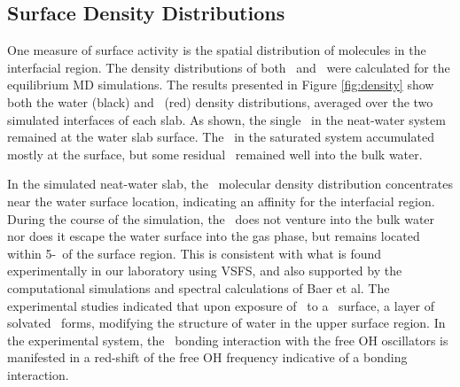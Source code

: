 \subsection{Surface Density Distributions}

One measure of surface activity is the spatial distribution of molecules in the interfacial region. The density distributions of both \wat~and \suldiox~were calculated for the equilibrium MD simulations. The results presented in Figure \ref{fig:density} show both the water (black) and \suldiox~(red) density distributions, averaged over the two simulated interfaces of each slab. As shown, the single \suldiox~in the neat-water system remained at the water slab surface. The \suldiox~in the saturated system accumulated mostly at the surface, but some residual \suldiox~remained well into the bulk water.



In the simulated neat-water slab, the \suldiox~molecular density distribution concentrates near the water surface location, indicating an affinity for the interfacial region. During the course of the simulation, the \suldiox~does not venture into the bulk water nor does it escape the water surface into the gas phase, but remains located within 5-\angs~of the surface region. This is consistent with what is found experimentally in our laboratory using VSFS,\cite{Tarbuck2005,Tarbuck2006} and also supported by the computational simulations and spectral calculations of Baer et al.\cite{Baer2010} The experimental studies indicated that upon exposure of \suldiox~to a \wat~surface, a layer of solvated \suldiox~forms, modifying the structure of water in the upper surface region. In the experimental system, the \suldiox~bonding interaction with the free OH oscillators is manifested in a red-shift of the free OH frequency indicative of a bonding interaction. 

